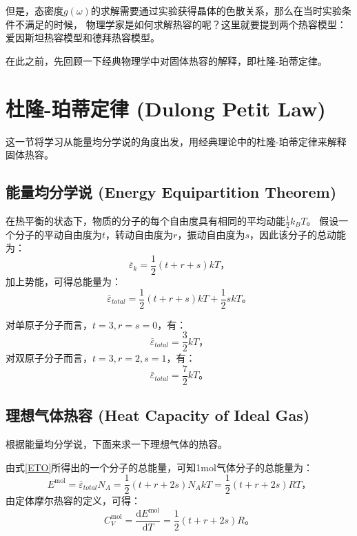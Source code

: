 \documentclass[declarePage]{ecnuthesis}
\begin{document}
但是，态密度$g(\omega)$的求解需要通过实验获得晶体的色散关系，那么在当时实验条件不满足的时候，%
物理学家是如何求解热容的呢？这里就要提到两个热容模型：爱因斯坦热容模型和德拜热容模型。

在此之前，先回顾一下经典物理学中对固体热容的解释，即杜隆-珀蒂定律。

\section{杜隆-珀蒂定律 (Dulong Petit Law)}

这一节将学习从能量均分学说的角度出发，用经典理论中的杜隆-珀蒂定律来解释固体热容。

\subsection{能量均分学说 (Energy Equipartition Theorem)}

在热平衡的状态下，物质的分子的每个自由度具有相同的平均动能$\frac{1}{2}k_BT$。%
假设一个分子的平动自由度为$t$，转动自由度为$r$，振动自由度为$s$，因此该分子的总动能为：
\begin{equation}
    \bar \varepsilon _k = \frac{1}{2} (t+r+s)kT \text{，}
\end{equation}
加上势能，可得总能量为：
\begin{equation}
    \bar \varepsilon _{total} = \frac{1}{2} (t+r+s)kT + \frac{1}{2}skT \text{。} \label{ETO}
\end{equation}

对单原子分子而言，$t=3,r=s=0$，有：
\begin{equation}
    \bar \varepsilon _{total} = \frac{3}{2} kT \text{，}
\end{equation}
对双原子分子而言，$t=3,r=2,s=1$，有：
\begin{equation}
    \bar \varepsilon _{total} = \frac{7}{2} kT \text{。} 
\end{equation}

\subsection{理想气体热容 (Heat Capacity of Ideal Gas)}

根据能量均分学说，下面来求一下理想气体的热容。

由式\ref{ETO}所得出的一个分子的总能量，可知1mol气体分子的总能量为：
\begin{equation}
    E^{\mathrm{mol}} = \bar \varepsilon _{total} N_A = \frac{1}{2} (t+r+2s)N_AkT = \frac{1}{2} (t+r+2s)RT \text{，}
\end{equation}
由定体摩尔热容的定义，可得：
\begin{equation}
    C_V^{\mathrm{mol}} = \frac{\mathrm{d}E^{\mathrm{mol}}}{\mathrm{d}T} = \frac{1}{2} (t+r+2s)R \text{。} 
\end{equation}
\end{document}
